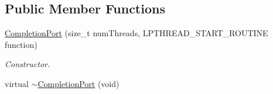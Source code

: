 \subsection*{Public Member Functions}
\begin{DoxyCompactItemize}
\item 
\hyperlink{class_completion_port_a7c797d9c9a81b521d521331c205efe12}{CompletionPort} (size\_\-t numThreads, LPTHREAD\_\-START\_\-ROUTINE function)
\begin{DoxyCompactList}\small\item\em Constructor. \item\end{DoxyCompactList}\item 
\hypertarget{class_completion_port_a8f931d166ae6ba7bf7344d92c5d83972}{
virtual \hyperlink{class_completion_port_a8f931d166ae6ba7bf7344d92c5d83972}{$\sim$CompletionPort} (void)}
\label{class_completion_port_a8f931d166ae6ba7bf7344d92c5d83972}


\end{DoxyCompactItemize}
